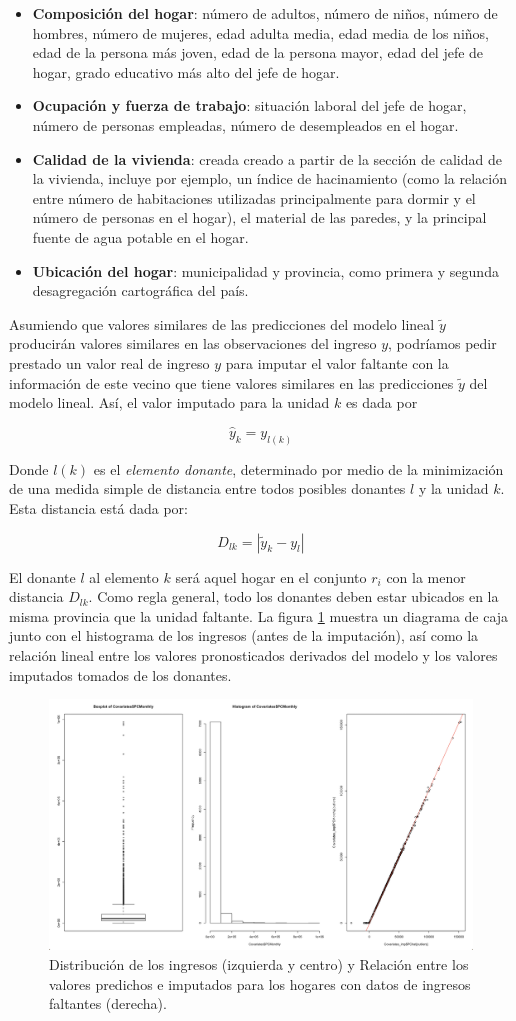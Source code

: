 \documentclass[
  12pt,
]{book}
\providecommand{\tightlist}{%
  \setlength{\itemsep}{0pt}\setlength{\parskip}{0pt}}
\begin{document}
\begin{itemize}
\tightlist
\item
  \textbf{Composición del hogar}: número de adultos, número de niños, número de hombres, número de mujeres, edad adulta media, edad media de los niños, edad de la persona más joven, edad de la persona mayor, edad del jefe de hogar, grado educativo más alto del jefe de hogar.
\item
  \textbf{Ocupación y fuerza de trabajo}: situación laboral del jefe de hogar, número de personas empleadas, número de desempleados en el hogar.
\item
  \textbf{Calidad de la vivienda}: creada creado a partir de la sección de calidad de la vivienda, incluye por ejemplo, un índice de hacinamiento (como la relación entre número de habitaciones utilizadas principalmente para dormir y el número de personas en el hogar), el material de las paredes, y la principal fuente de agua potable en el hogar.
\item
  \textbf{Ubicación del hogar}: municipalidad y provincia, como primera y segunda desagregación cartográfica del país.
\end{itemize}

Asumiendo que valores similares de las predicciones del modelo lineal \(\tilde y\) producirán valores similares en las observaciones del ingreso \(y\), podríamos pedir prestado un valor real de ingreso \(y\) para imputar el valor faltante con la información de este vecino que tiene valores similares en las predicciones \(\tilde y\) del modelo lineal. Así, el valor imputado para la unidad \(k\) es dada por

\[\hat{y}_k = y_{l(k)}\]

Donde \(l(k)\) es el \emph{elemento donante}, determinado por medio de la minimización de una medida simple de distancia entre todos posibles donantes \(l\) y la unidad \(k\). Esta distancia está dada por:

\[
D_{lk} = |\tilde y_k - y_l|
\]

El donante \(l\) al elemento \(k\) será aquel hogar en el conjunto \(r_i\) con la menor distancia \(D_{lk}\). Como regla general, todo los donantes deben estar ubicados en la misma provincia que la unidad faltante. La figura \ref{fig:fig10} muestra un diagrama de caja junto con el histograma de los ingresos (antes de la imputación), así como la relación lineal entre los valores pronosticados derivados del modelo y los valores imputados tomados de los donantes.

\begin{figure}
\includegraphics[width=0.5\linewidth]{Pics/10} \caption{Distribución de los ingresos (izquierda y centro) y Relación entre los valores predichos e imputados para los hogares con datos de ingresos faltantes (derecha).}\label{fig:fig10}
\end{figure}
\end{document}
